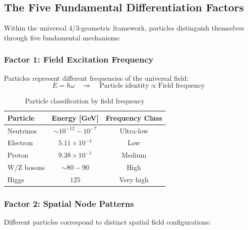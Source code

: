	\subsection{The Five Fundamental Differentiation Factors}
	\label{subsec:five_factors}
	
	Within the universal 4/3-geometric framework, particles distinguish themselves through five fundamental mechanisms:
	
	\subsubsection{Factor 1: Field Excitation Frequency}
	\label{subsubsec:excitation_frequency}
	
	Particles represent different frequencies of the universal field:
	\begin{equation}
		E = \hbar \omega \quad \Rightarrow \quad \text{Particle identity} \propto \text{Field frequency}
		\label{eq:frequency_identity}
	\end{equation}
	
	\begin{table}[htbp]
		\centering
		\begin{tabular}{lcc}
			\toprule
			\textbf{Particle} & \textbf{Energy [GeV]} & \textbf{Frequency Class} \\
			\midrule
			Neutrinos & $\sim 10^{-12} - 10^{-7}$ & Ultra-low \\
			Electron & $5.11 \times 10^{-4}$ & Low \\
			Proton & $9.38 \times 10^{-1}$ & Medium \\
			W/Z bosons & $\sim 80-90$ & High \\
			Higgs & $125$ & Very high \\
			\bottomrule
		\end{tabular}
		\caption{Particle classification by field frequency}
		\label{tab:frequency_classification}
	\end{table}
	
	\subsubsection{Factor 2: Spatial Node Patterns}
	\label{subsubsec:spatial_patterns}
	
	Different particles correspond to distinct spatial field configurations:
	
